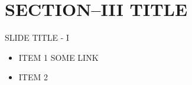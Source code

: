 


\maketitle
\section{SECTION--III TITLE}
\begin{frame}[t]{SLIDE TITLE - I}
    \begin{itemize}
      \item ITEM 1
      SOME LINK
      \item ITEM 2
    \end{itemize}

\end{frame}


